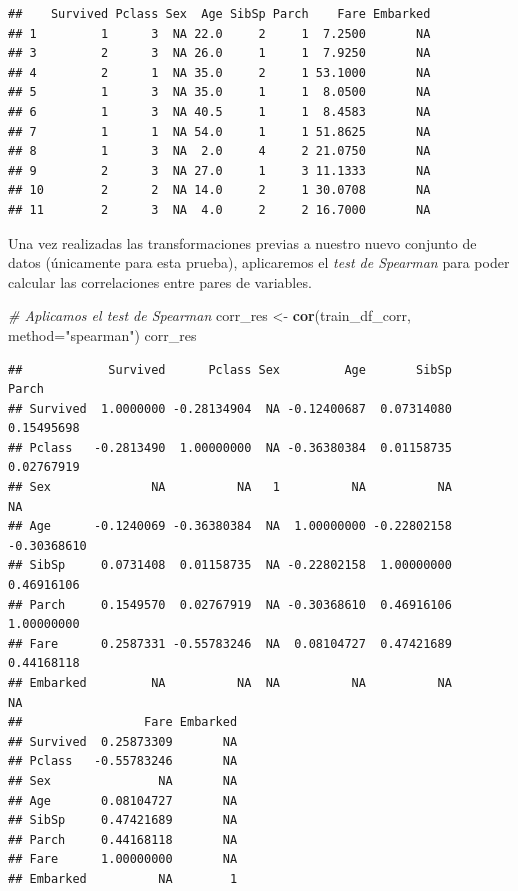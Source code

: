 \documentclass[]{article}
\newenvironment{Shaded}{\begin{snugshade}}{\end{snugshade}}
\newcommand{\CommentTok}[1]{\textcolor[rgb]{0.56,0.35,0.01}{\textit{#1}}}
\newcommand{\DataTypeTok}[1]{\textcolor[rgb]{0.13,0.29,0.53}{#1}}
\newcommand{\KeywordTok}[1]{\textcolor[rgb]{0.13,0.29,0.53}{\textbf{#1}}}
\newcommand{\NormalTok}[1]{#1}
\newcommand{\StringTok}[1]{\textcolor[rgb]{0.31,0.60,0.02}{#1}}
\begin{document}
\begin{verbatim}
##    Survived Pclass Sex  Age SibSp Parch    Fare Embarked
## 1         1      3  NA 22.0     2     1  7.2500       NA
## 3         2      3  NA 26.0     1     1  7.9250       NA
## 4         2      1  NA 35.0     2     1 53.1000       NA
## 5         1      3  NA 35.0     1     1  8.0500       NA
## 6         1      3  NA 40.5     1     1  8.4583       NA
## 7         1      1  NA 54.0     1     1 51.8625       NA
## 8         1      3  NA  2.0     4     2 21.0750       NA
## 9         2      3  NA 27.0     1     3 11.1333       NA
## 10        2      2  NA 14.0     2     1 30.0708       NA
## 11        2      3  NA  4.0     2     2 16.7000       NA
\end{verbatim}

Una vez realizadas las transformaciones previas a nuestro nuevo conjunto
de datos (únicamente para esta prueba), aplicaremos el \emph{test de
Spearman} para poder calcular las correlaciones entre pares de
variables.

\begin{Shaded}
\begin{Highlighting}[]
\CommentTok{# Aplicamos el test de Spearman}
\NormalTok{corr_res <-}\StringTok{ }\KeywordTok{cor}\NormalTok{(train_df_corr, }\DataTypeTok{method=}\StringTok{"spearman"}\NormalTok{)}
\NormalTok{corr_res}
\end{Highlighting}
\end{Shaded}

\begin{verbatim}
##            Survived      Pclass Sex         Age       SibSp       Parch
## Survived  1.0000000 -0.28134904  NA -0.12400687  0.07314080  0.15495698
## Pclass   -0.2813490  1.00000000  NA -0.36380384  0.01158735  0.02767919
## Sex              NA          NA   1          NA          NA          NA
## Age      -0.1240069 -0.36380384  NA  1.00000000 -0.22802158 -0.30368610
## SibSp     0.0731408  0.01158735  NA -0.22802158  1.00000000  0.46916106
## Parch     0.1549570  0.02767919  NA -0.30368610  0.46916106  1.00000000
## Fare      0.2587331 -0.55783246  NA  0.08104727  0.47421689  0.44168118
## Embarked         NA          NA  NA          NA          NA          NA
##                 Fare Embarked
## Survived  0.25873309       NA
## Pclass   -0.55783246       NA
## Sex               NA       NA
## Age       0.08104727       NA
## SibSp     0.47421689       NA
## Parch     0.44168118       NA
## Fare      1.00000000       NA
## Embarked          NA        1
\end{verbatim}
\end{document}
